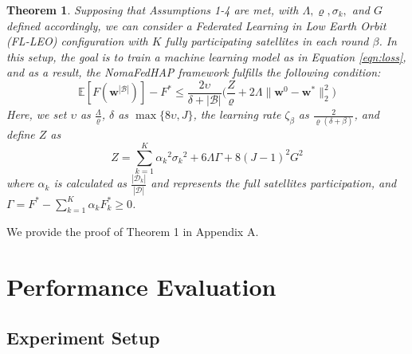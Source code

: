 \documentclass[letter,journal]{IEEEtran}
\newtheorem{theorem}{Theorem}
\begin{document}
\begin{theorem}\label{th:Theorem}
Supposing that Assumptions 1-4 are met, with $\Lambda, \varrho, \sigma_{k},$ and $G$ defined accordingly, we can consider a Federated Learning in Low Earth Orbit (FL-LEO) configuration with $K$ fully participating satellites in each round $\beta$. In this setup, the goal is to train a machine learning model as in Equation \eqref{eqn:loss}, and as a result, the NomaFedHAP framework fulfills the following condition:
\begin{equation}
    \mathbb{E}[F(\boldsymbol{w}^{|\mathcal{B}|})]-F^*\leq\frac{2\upsilon}{\delta+|\mathcal{B}|}\biggl(\frac{Z}{\varrho}+2 \Lambda\|\boldsymbol{w}^{0}-\boldsymbol{w}^{*}\|^2_2 \biggl)
\end{equation}
Here, we set $\upsilon$ as $\frac{\Lambda}{\varrho}$, $\delta$ as $\max\{8\upsilon,J\}$, the learning rate $\zeta_{{\beta}}$ as $\frac{2}{\varrho(\delta+\beta)}$, and define $Z$ as 
$$Z=\sum_{k=1}^{K} {\alpha_k}^2{\sigma_{k}}^2+6\Lambda \Gamma+8(J-1)^2G^2$$
where $\alpha_k$ is calculated as $\frac{|\mathcal{D}_k|}{|\mathcal{D}|}$ and represents the full satellites participation, and $\Gamma=F^*-\sum_{k=1}^{K}\alpha_kF^{*}_{k}\geq0$.
\end{theorem}
We provide the proof of Theorem 1 in Appendix A.


\section{Performance Evaluation}\label{sec:Evaluation}

\subsection{Experiment Setup}
\end{document}
